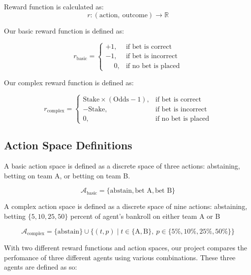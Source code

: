 \documentclass[sigconf]{acmart}
\begin{document}
Reward function is calculated as:
\[
r: (\text{action},\ \text{outcome}) \rightarrow \mathbb{R}
\]

Our basic reward function is defined as:

\begin{equation}
r_{\text{basic}} =
\begin{cases}
+1, & \text{if bet is correct} \\
-1, & \text{if bet is incorrect} \\
\phantom{+}0, & \text{if no bet is placed}
\end{cases}
\end{equation}

Our complex reward function is defined as:

\begin{equation}
r_{\text{complex}} =
\begin{cases}
\text{Stake} \times (\text{Odds} - 1), & \text{if bet is correct} \\
-\text{Stake}, & \text{if bet is incorrect} \\
\text{0}, & \text{if no bet is placed}
\end{cases}
\end{equation}

\subsection{Action Space Definitions}

A basic action space is defined as a discrete space of three actions: abstaining, betting on team A, or betting on team B. 

\begin{equation}
\mathcal{A}_{\text{basic}} = \{\text{abstain}, \text{bet A}, \text{bet B} \}
\end{equation}

A complex action space is defined as a discrete space of nine actions: abstaining, betting $\{5, 10, 25, 50\}$ percent of agent's bankroll on either team A or B

\begin{equation}
\mathcal{A}_{\text{complex}} = \{\text{abstain}\} \cup \{(t, p) \mid t \in \{\text{A}, \text{B}\},\ p \in \{5\%, 10\%, 25\%, 50\%\} \}
\end{equation}

With two different reward functions and action spaces, our project compares the perfomance of three different agents using various combinations. These three agents are defined as so: 
\end{document}
